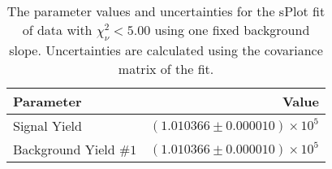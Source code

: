 
\begin{table}[ht]
    \begin{center}
        \begin{tabular}{lr}\toprule
            Parameter & Value \\\midrule
            Signal Yield & $(1.010366 \pm 0.000010) \times 10^{5}$ \\
            Background Yield $\#1$ & $(1.010366 \pm 0.000010) \times 10^{5}$ \\\bottomrule
        \end{tabular}
        \caption{The parameter values and uncertainties for the sPlot fit of data with $\chi^2_\nu < 5.00$ using one fixed background slope. Uncertainties are calculated using the covariance matrix of the fit.}\label{tab:splot-fit-results-chisqdof-5.00-fixed-1}
    \end{center}
\end{table}
